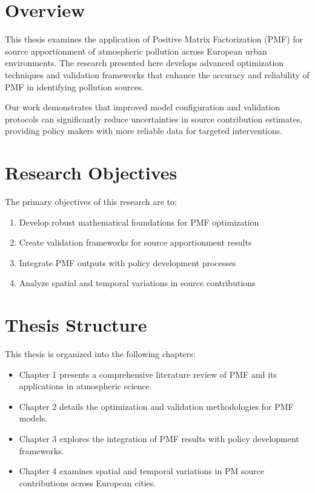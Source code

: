 \documentclass[
  letterpaper,
  oneside,
  openany]{MastersDoctoralThesis}
\providecommand{\tightlist}{%
  \setlength{\itemsep}{0pt}\setlength{\parskip}{0pt}}\usepackage{longtable,booktabs,array}
\begin{document}
\section*{Overview}\label{overview}


This thesis examines the application of Positive Matrix Factorization
(PMF) for source apportionment of atmospheric pollution across European
urban environments. The research presented here develops advanced
optimization techniques and validation frameworks that enhance the
accuracy and reliability of PMF in identifying pollution sources.

Our work demonstrates that improved model configuration and validation
protocols can significantly reduce uncertainties in source contribution
estimates, providing policy makers with more reliable data for targeted
interventions.

\section*{Research Objectives}\label{research-objectives}


The primary objectives of this research are to:

\begin{enumerate}
\def\labelenumi{\arabic{enumi}.}
\tightlist
\item
  Develop robust mathematical foundations for PMF optimization
\item
  Create validation frameworks for source apportionment results
\item
  Integrate PMF outputs with policy development processes
\item
  Analyze spatial and temporal variations in source contributions
\end{enumerate}

\section*{Thesis Structure}\label{thesis-structure}


This thesis is organized into the following chapters:

\begin{itemize}
\tightlist
\item
  Chapter 1 presents a comprehensive literature review of PMF and its
  applications in atmospheric science.
\item
  Chapter 2 details the optimization and validation methodologies for
  PMF models.
\item
  Chapter 3 explores the integration of PMF results with policy
  development frameworks.
\item
  Chapter 4 examines spatial and temporal variations in PM source
  contributions across European cities.
\end{itemize}
\end{document}
